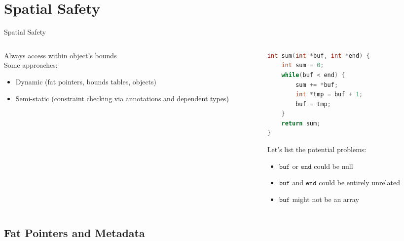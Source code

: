 \documentclass[aspectratio=169]{beamer}
\begin{document}

\section{Spatial Safety}

\begin{frame}[fragile]{Spatial Safety}
  \begin{columns}[T]
    \begin{column}{0.45\textwidth}
        \vspace{0.1in}
        Always access within object's bounds
        \\
        \vspace{0.2in}
        Some approaches:
        \begin{itemize}
            \item Dynamic (fat pointers, bounds tables, objects)
            \item Semi-static (constraint checking via annotations and dependent types)
        \end{itemize}
    \end{column}
    \begin{column}{0.45\textwidth}
\begin{lstlisting}[language=C,mathescape,basicstyle={\small\ttfamily}]
int sum(int *buf, int *end) {
    int sum = 0;
    while(buf < end) {
        sum += *buf;
        int *tmp = buf + 1;
        buf = tmp;
    }
    return sum;
}
\end{lstlisting}
        \footnotesize{
Let's list the potential problems:
        \begin{itemize}
            \item $\texttt{buf}$ or $\texttt{end}$ could be null
            \item $\texttt{buf}$ and $\texttt{end}$ could be entirely unrelated
            \item $\texttt{buf}$ might not be an array %
        \end{itemize}
    }
    \end{column}
  \end{columns}
\end{frame}

\subsection{Fat Pointers and Metadata}
\end{document}
